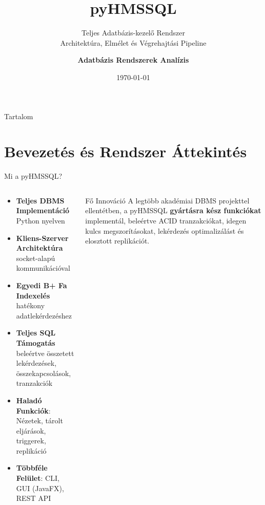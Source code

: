 \documentclass[aspectratio=169]{beamer}
\title{\textbf{pyHMSSQL}}
\subtitle{Teljes Adatbázis-kezelő Rendszer\\Architektúra, Elmélet és Végrehajtási Pipeline}
\author{\textbf{Adatbázis Rendszerek Analízis}}
\institute{Haladó Adatbázis Rendszerek}
\date{\today}
\begin{document}
\frame{\titlepage}

\begin{frame}{Tartalom}
\tableofcontents[hideallsubsections]
\end{frame}

\section{Bevezetés és Rendszer Áttekintés}

\begin{frame}{Mi a pyHMSSQL?}
\begin{columns}
\begin{column}{0.6\textwidth}
\begin{itemize}
    \item \textbf{Teljes DBMS Implementáció} Python nyelven
    \item \textbf{Kliens-Szerver Architektúra} socket-alapú kommunikációval
    \item \textbf{Egyedi B+ Fa Indexelés} hatékony adatlekérdezéshez
    \item \textbf{Teljes SQL Támogatás} beleértve összetett lekérdezések, összekapcsolások, tranzakciók
    \item \textbf{Haladó Funkciók}: Nézetek, tárolt eljárások, triggerek, replikáció
    \item \textbf{Többféle Felület}: CLI, GUI (JavaFX), REST API
\end{itemize}
\end{column}
\begin{column}{0.35\textwidth}
\begin{alertblock}{Fő Innováció}
A legtöbb akadémiai DBMS projekttel ellentétben, a pyHMSSQL \textbf{gyártásra kész funkciókat} implementál, beleértve ACID tranzakciókat, idegen kulcs megszorításokat, lekérdezés optimalizálást és elosztott replikációt.
\end{alertblock}
\end{column}
\end{columns}
\end{frame}
\end{document}
